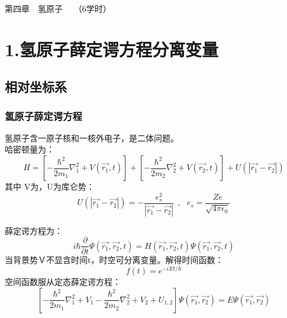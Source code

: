 \begin{frame}
		\frametitle{}
	    \begin{center}
		{ {\Huge 第四章~~氢原子~~  （6学时）}}
	    \end{center}    
\end{frame}

\section{1.氢原子薛定谔方程分离变量 }

\subsection{相对坐标系}

\begin{frame}
	\frametitle{氢原子薛定谔方程}
	氢原子含一原子核和一核外电子，是二体问题。\\
	哈密顿量为：
	\begin{equation*}
		H=\left[-\frac{\hbar^2}{2 m_1} \nabla_1 ^2 + V(\vec{r_1},t) \right]  + \left[-\frac{\hbar^2}{2 m_2} \nabla_2 ^2 + V(\vec{r_2},t) \right]  +U(| \vec{r_1}-\vec{r_2} | )
	\end{equation*}
	其中 V为，U为库仑势：
	\begin{equation*}
		U(| \vec{r_1}-\vec{r_2} | )=-\frac{e_s ^2}{| \vec{r_1}-\vec{r_2} |} ~~,~~~ e_s =\frac{Ze}{\sqrt{4\pi\epsilon_0}}
	\end{equation*}
\end{frame}

\begin{frame}
	薛定谔方程为：
	\begin{equation*}
		i\hbar \frac{\partial }{\partial t} \Psi (\vec{r_1},\vec{r_2},t ) =H (\vec{r_1},\vec{r_2}, t  )  \Psi (\vec{r_1},\vec{r_2},t ) 
	\end{equation*}
	当背景势Ｖ不显含时间t，时空可分离变量。解得时间函数：
	\begin{equation*}
		f(t) =e^{-iEt/\hbar}
	\end{equation*}
	空间函数服从定态薛定谔方程：
	\begin{equation*}
		\left[-\frac{\hbar^2}{2 m_1} \nabla_1 ^2 + V_1  -\frac{\hbar^2}{2 m_2} \nabla_2 ^2 + V_2  +U_{1,2} \right] \Psi (\vec{r_1},\vec{r_2}) =E \Psi (\vec{r_1},\vec{r_2}) 
	\end{equation*}
\end{frame}		

